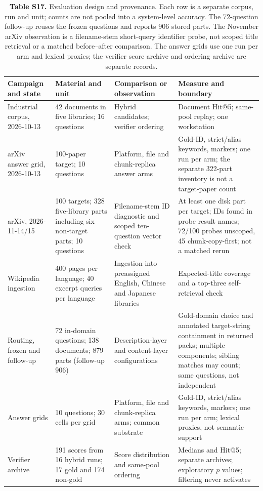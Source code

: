 \begin{table}
\centering
\footnotesize
\setlength{\tabcolsep}{4pt}
\caption{\textbf{Table S17.} Evaluation design and provenance. Each row is a separate corpus, run
and unit; counts are not pooled into a system-level accuracy. The 72-question
follow-up reuses the frozen questions and reports 906 stored parts. The
November arXiv observation is a filename-stem short-query identifier probe,
not scoped title retrieval or a matched before--after comparison. The answer
grids use one run per arm and lexical proxies; the verifier score archive and
ordering archive are separate records.}

\begin{tabular}{@{}p{2.640cm}p{3.465cm}p{4.125cm}p{4.950cm}@{}}
\toprule
Campaign and state & Material and unit & Comparison or observation & Measure and boundary\\
\midrule
Industrial corpus, 2026-10-13 & 42 documents in five libraries; 16 questions & Hybrid candidates; verifier ordering & Document Hit@5; same-pool replay; one workstation\\
arXiv answer grid, 2026-10-13 & 100-paper target; 10 questions & Platform, file and chunk-replica answer arms & Gold-ID, strict/alias keywords, markers; one run per arm; the separate 322-part inventory is not a target-paper count\\
arXiv, 2026-11-14/15 & 100 targets; 328 five-library parts including six non-target parts; 10 questions & Filename-stem ID diagnostic and scoped ten-question vector check & At least one disk part per target; IDs found in probe result names; 72/100 probes unscoped, 45 chunk-copy-first; not a matched rerun\\
Wikipedia ingestion & 400 pages per language; 40 excerpt queries per language & Ingestion into preassigned English, Chinese and Japanese libraries & Expected-title coverage and a top-three self-retrieval check\\
Routing, frozen and follow-up & 72 in-domain questions; 138 documents; 879 parts (follow-up 906) & Description-layer and content-layer configurations & Gold-domain choice and annotated target-string containment in returned packs; multiple components; sibling matches may count; same questions, not independent\\
Answer grids & 10 questions; 30 cells per grid & Platform, file and chunk-replica arms; common substrate & Gold-ID, strict/alias keywords, markers; one run per arm; lexical proxies, not semantic support\\
Verifier archive & 191 scores from 16 hybrid runs; 17 gold and 174 non-gold & Score distribution and same-pool ordering & Medians and Hit@5; separate archives; exploratory $p$ values; filtering never activates\\
\bottomrule
\end{tabular}
\end{table}

